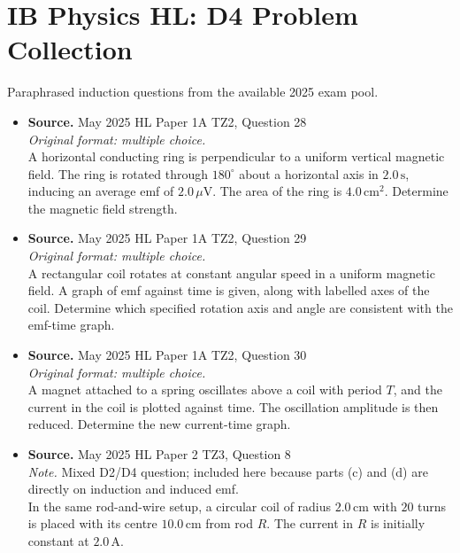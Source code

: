 \documentclass[11pt]{article}
\begin{document}
\section*{IB Physics HL: D4 Problem Collection}
Paraphrased induction questions from the available 2025 exam pool.
\begin{itemize}[leftmargin=1.25em]
\item
\textbf{Source.} May 2025 HL Paper 1A TZ2, Question 28\\
\textit{Original format: multiple choice.}\\
A horizontal conducting ring is perpendicular to a uniform vertical magnetic field. The ring is rotated through $180^\circ$ about a horizontal axis in $2.0\,\text{s}$, inducing an average emf of $2.0\,\mu\text{V}$. The area of the ring is $4.0\,\text{cm}^2$. Determine the magnetic field strength.
\item
\textbf{Source.} May 2025 HL Paper 1A TZ2, Question 29\\
\textit{Original format: multiple choice.}\\
A rectangular coil rotates at constant angular speed in a uniform magnetic field. A graph of emf against time is given, along with labelled axes of the coil. Determine which specified rotation axis and angle are consistent with the emf-time graph.
\item
\textbf{Source.} May 2025 HL Paper 1A TZ2, Question 30\\
\textit{Original format: multiple choice.}\\
A magnet attached to a spring oscillates above a coil with period $T$, and the current in the coil is plotted against time. The oscillation amplitude is then reduced. Determine the new current-time graph.
\item
\textbf{Source.} May 2025 HL Paper 2 TZ3, Question 8\\
\textit{Note.} Mixed D2/D4 question; included here because parts (c) and (d) are directly on induction and induced emf.\\
In the same rod-and-wire setup, a circular coil of radius $2.0\,\text{cm}$ with $20$ turns is placed with its centre $10.0\,\text{cm}$ from rod $R$. The current in $R$ is initially constant at $2.0\,\text{A}$.


\end{itemize}
\end{document}

